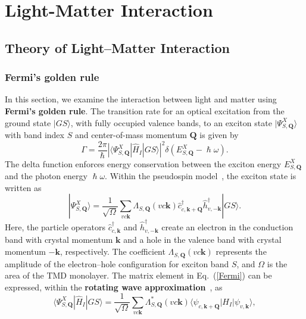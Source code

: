 \chapter{Light-Matter Interaction}
\label{ch:method}

\section{Theory of Light--Matter Interaction}
\subsection{Fermi's golden rule}

In this section, we examine the interaction between light and matter using \textbf{Fermi's golden rule}. The transition rate for an optical excitation from the ground state $|GS\rangle$, with fully occupied valence bands, to an exciton state $|\Psi_{S, \boldsymbol{Q}}^{X}\rangle$ with band index $S$ and center-of-mass momentum $\boldsymbol{Q}$ is given by
\begin{equation}
\Gamma=\frac{2\pi}{\hslash}
\left|
\langle\Psi_{S, \boldsymbol{Q}}^{X}|\hat{H}_I|GS\rangle
\right|^2
\delta(E^X_{S, \boldsymbol{Q}}-\hslash\omega).
\label{Fermi}
\end{equation}
The delta function enforces energy conservation between the exciton energy $E^X_{S, \boldsymbol{Q}}$ and the photon energy $\hslash\omega$. Within the pseudospin model~\cite{simbulan2021selective, peng2022tailoring, sanchez2024enhanced}, the exciton state is written as
\begin{equation}
|\Psi_{S, \boldsymbol{Q}}^{X}\rangle
=
\frac{1}{\sqrt{\Omega}} 
\sum_{vc\boldsymbol{k}} 
\Lambda_{S,\boldsymbol{Q}}(vc\boldsymbol{k})
\hat{c}^\dagger_{c,\boldsymbol{k}+\boldsymbol{Q}} 
\hat{h}^\dagger_{v,-\boldsymbol{k}} 
|GS\rangle.
\label{EXstate}
\end{equation}
Here, the particle operators $\hat{c}_{c,\boldsymbol{k}}^\dagger$ and $\hat{h}_{v,-\boldsymbol{k}}^\dagger$ create an electron in the conduction band with crystal momentum $\boldsymbol{k}$ and a hole in the valence band with crystal momentum $-\boldsymbol{k}$, respectively. The coefficient $\Lambda_{S,\boldsymbol{Q}}(vc\boldsymbol{k})$ represents the amplitude of the electron--hole configuration for exciton band $S$, and $\Omega$ is the area of the TMD monolayer.
The matrix element in Eq.~(\ref{Fermi}) can be expressed, within the \textbf{rotating wave approximation}~\cite{griffiths2018introduction}, as
\begin{equation}
\langle\Psi_{S, \boldsymbol{Q}}^{X}|\hat{H}_I|GS\rangle 
=
\frac{1}{\sqrt{\Omega}} 
\sum_{vc\boldsymbol{k}} 
\Lambda^*_{S,\boldsymbol{Q}}(vc\boldsymbol{k}) 
\langle\psi_{c, \boldsymbol{k}+\boldsymbol{Q}}|H_I|\psi_{v, \boldsymbol{k}}\rangle,
\label{eq:matrix_element}
\end{equation}
